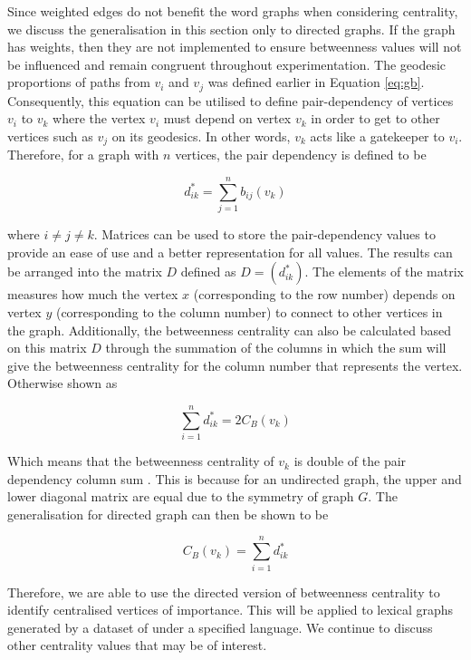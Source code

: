 Since weighted edges do not benefit the word graphs when considering centrality, we discuss the generalisation in this section only to directed graphs. If the graph has weights, then they are not implemented to ensure betweenness values will not be influenced and remain congruent throughout experimentation. The geodesic proportions of paths from $v_i$ and $v_j$ was defined earlier in Equation \ref{eq:gb}. Consequently, this equation can be utilised to define pair-dependency of vertices $v_i$ to $v_k$ where the vertex $v_i$ must depend on vertex $v_k$ in order to get to other vertices such as $v_j$ on its geodesics. In other words, $v_k$ acts like a gatekeeper to $v_i$. Therefore, for a graph with $n$ vertices, the pair dependency is defined to be 

\begin{equation}\label{eq:bcrmv}
d^*_{ik} = \sum_{j=1}^{n}b_{ij}(v_k)
\end{equation}

where $i \ne j \ne k$. Matrices can be used to store the pair-dependency values to provide an ease of use and a better representation for all values. The results can be arranged into the matrix $D$ defined as $D = (d^*_{ik})$. The elements of the matrix measures how much the vertex $x$ (corresponding to the row number) depends on vertex $y$ (corresponding to the column number) to connect to other vertices in the graph. Additionally, the betweenness centrality can also be calculated based on this matrix $D$ through the summation of the columns in which the sum will give the betweenness centrality for the column number that represents the vertex. Otherwise shown as

\begin{equation}
\sum_{i=1}^nd^*_{ik} = 2C_B(v_k)
\end{equation}

Which means that the betweenness centrality of $v_k$ is double of the pair dependency column sum \cite{white1994betweenness}. This is because for an undirected graph, the upper and lower diagonal matrix are equal due to the symmetry of graph $G$. The generalisation for directed graph can then be shown to be

\begin{equation}
C_B(v_k) = \sum_{i=1}^nd^*_{ik}
\end{equation}

Therefore, we are able to use the directed version of betweenness centrality to identify centralised vertices of importance. This will be applied to lexical graphs generated by a dataset of under a specified language. We continue to discuss other centrality values that may be of interest.

